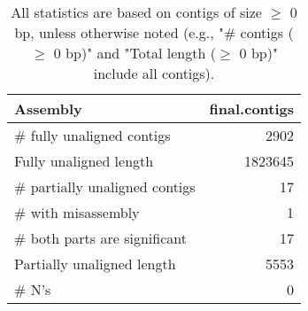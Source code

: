 \documentclass[12pt,a4paper]{article}
\begin{document}
\begin{table}[ht]
\begin{center}
\caption{All statistics are based on contigs of size $\geq$ 0 bp, unless otherwise noted (e.g., "\# contigs ($\geq$ 0 bp)" and "Total length ($\geq$ 0 bp)" include all contigs).}
\begin{tabular}{|l*{1}{|r}|}
\hline
Assembly & final.contigs \\ \hline
\# fully unaligned contigs & 2902 \\ \hline
Fully unaligned length & 1823645 \\ \hline
\# partially unaligned contigs & 17 \\ \hline
\hspace{5mm}\# with misassembly & 1 \\ \hline
\hspace{5mm}\# both parts are significant & 17 \\ \hline
Partially unaligned length & 5553 \\ \hline
\# N's & 0 \\ \hline
\end{tabular}
\end{center}
\end{table}
\end{document}
